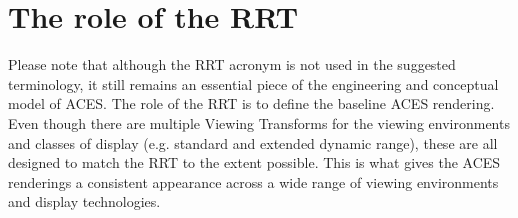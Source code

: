 \numberedformat
\chapter{The role of the RRT}

Please note that although the RRT acronym is not used in the suggested terminology, it still remains an essential piece of the engineering and conceptual model of ACES. The role of the RRT is to define the baseline ACES rendering. Even though there are multiple Viewing Transforms for the viewing environments and classes of display (e.g. standard and extended dynamic range), these are all designed to match the RRT to the extent possible. This is what gives the ACES renderings a consistent appearance across a wide range of viewing environments and display technologies.